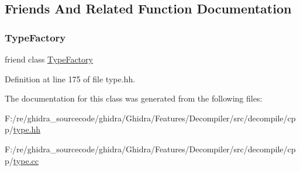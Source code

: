 \subsection{Friends And Related Function Documentation}
\mbox{\label{class_type_char_ac8c1945d0a63785e78b3e09a13226ed6}} 
\subsubsection{\texorpdfstring{TypeFactory}{TypeFactory}}
{\footnotesize\ttfamily friend class \mbox{\hyperlink{class_type_factory}{Type\+Factory}}\hspace{0.3cm}{\ttfamily [friend]}}



Definition at line 175 of file type.\+hh.



The documentation for this class was generated from the following files\+:\begin{DoxyCompactItemize}
\item 
F\+:/re/ghidra\+\_\+sourcecode/ghidra/\+Ghidra/\+Features/\+Decompiler/src/decompile/cpp/\mbox{\hyperlink{type_8hh}{type.\+hh}}\item 
F\+:/re/ghidra\+\_\+sourcecode/ghidra/\+Ghidra/\+Features/\+Decompiler/src/decompile/cpp/\mbox{\hyperlink{type_8cc}{type.\+cc}}\end{DoxyCompactItemize}
